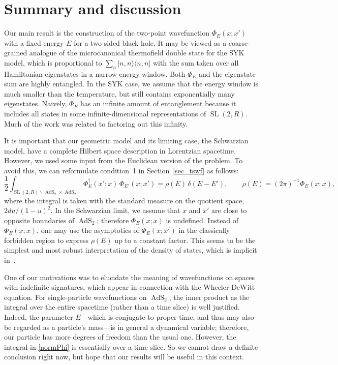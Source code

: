 \documentclass[12pt]{article}
\newcommand*{\bra}[1]{\langle{#1}|}
\newcommand*{\ket}[1]{|{#1}\rangle}
\newcommand{\RR}{\mathbb{R}}
\DeclareMathOperator{\tSL}{\widetilde{\mathrm{SL}}}
\DeclareMathOperator{\tAdS}{\widetilde{AdS}}
\def\widetilde#1{#1}%
\def\RR{R}
\begin{document}
\section{Summary and discussion}

Our main result is the construction of the two-point wavefunction $\Phi_E(x;x')$ with a fixed energy $E$ for a two-sided black hole. It may be viewed as a coarse-grained analogue of the microcanonical thermofield double state for the SYK model, which is proportional to $\sum_{n}\ket{n,n}\bra{n,n}$ with the sum taken over all Hamiltonian eigenstates in a narrow energy window. Both $\Phi_E$ and the eigenstate sum are highly entangled. In the SYK case, we assume that the energy window is much smaller than the temperature, but still contains exponentially many eigenstates. Naively, $\Phi_E$ has an infinite amount of entanglement because it includes all states in some infinite-dimensional representations of $\tSL(2,\RR)$. Much of the work was related to factoring out this infinity.

It is important that our geometric model and its limiting case, the Schwarzian model, have a complete Hilbert space description in Lorentzian spacetime. However, we used some input from the Euclidean version of the problem. To avoid this, we can reformulate condition~1 in Section~\ref{sec_tswf} as follows:
\begin{equation}\label{normPhi}
\frac{1}{2}\int_{\tSL(2,\RR)\backslash \tAdS_2 \times \tAdS_2}
\Phi^{\dagger}_E(x'; x)\,\Phi_{E'}(x; x')
=\rho(E)\,\delta(E-E'),\qquad
\rho(E)=(2\pi)^{-1}\Phi_E(x;x),
\end{equation}
where the integral is taken with the standard measure on the quotient space, $2du/(1-u)^2$. In the Schwarzian limit, we assume that $x$ and $x'$ are close to opposite boundaries of $\tAdS_2$; therefore $\Phi_E(x;x)$ is undefined. Instead of $\Phi_E(x;x)$, one may use the asymptotics of $\Phi_E(x;x')$ in the classically forbidden region to express $\rho(E)$ up to a constant factor. This seems to be the simplest and most robust interpretation of the density of states, which is implicit in~\cite{BaAlKa16,BaAlKa17}.

One of our motivations was to elucidate the meaning of wavefunctions on spaces with indefinite signatures, which appear in connection with the Wheeler-DeWitt equation. For single-particle wavefunctions on $\tAdS_2$, the inner product as the integral over the entire spacetime (rather than a time slice) is well justified. Indeed, the parameter $E$---which is conjugate to proper time, and thus may also be regarded as a particle's mass---is in general a dynamical variable; therefore, our particle has more degrees of freedom than the usual one. However, the integral in \eqref{normPhi} is essentially over a time slice. So we cannot draw a definite conclusion right now, but hope that our results will be useful in this context. 
\end{document}
